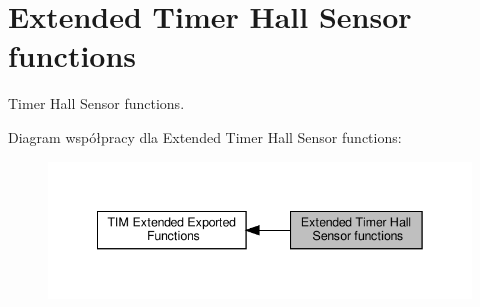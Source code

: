 \hypertarget{group___t_i_m_ex___exported___functions___group1}{}\section{Extended Timer Hall Sensor functions}
\label{group___t_i_m_ex___exported___functions___group1}


Timer Hall Sensor functions.  


Diagram współpracy dla Extended Timer Hall Sensor functions\+:\nopagebreak
\begin{figure}[H]
\begin{center}
\leavevmode
\includegraphics[width=342pt]{group___t_i_m_ex___exported___functions___group1}
\end{center}
\end{figure}
